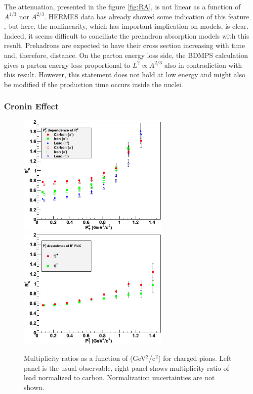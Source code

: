 The attenuation, presented in the figure \ref{fig:RA}, is not linear as 
a function of $A^{1/3}$ nor $A^{2/3}$. HERMES data has already showed some indication 
of this feature \cite{Airapetian:2007vu,Airapetian:2009jy}, but here, the nonlinearity, 
which has important implication on models, is clear. Indeed, it seems difficult 
to conciliate the prehadron absorption models with this result. Prehadrons 
are expected to have their cross section increasing with time and, therefore, 
distance. On the parton energy loss side, the BDMPS calculation gives a parton energy loss proportional to 
$L^2 \propto A^{2/3}$ also in contradiction with this result. However, 
this statement does not hold at low energy and might also be 
modified if the production time occurs inside the nuclei.

\subsubsection{Cronin Effect}

\begin{figure}[p]
\centering
\includegraphics[width=7.4cm] {chap6-fig/F_RvPt.png} 
\includegraphics[width=7.4cm] {chap6-fig/F_RvPt_PbC.png} 
\caption {Multiplicity ratios as a function of \pt (GeV$^2$/c$^2$) for charged pions. Left panel is 
the usual observable, right panel shows multiplicity ratio of lead normalized to carbon.
Normalization uncertainties are not shown.}
\label{fig:RPt}
\end{figure}

